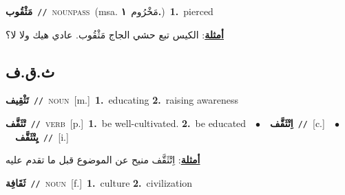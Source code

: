\documentclass[10pt,a4paper,twoside]{article} %
\begin{document}
\begin{multicols}{2}
{\setlength\topsep{0pt}\textbf{\foreignlanguage{arabic}{مَثْقُوب}}\ {\color{gray}\texttt{//}\color{black}}\ \textsc{noun\textunderscore pass}\ \color{gray}(msa. \foreignlanguage{arabic}{مَخْرُوم}~\foreignlanguage{arabic}{\textbf{١.}})\color{black}\ \textbf{1.}~pierced\  \begin{flushright}\color{gray}\foreignlanguage{arabic}{\textbf{\underline{\foreignlanguage{arabic}{أمثلة}}}: الكيس تبع حشي الجاج مَثْقُوب. عادي هيك ولا لا؟}\end{flushright}\color{black}} \vspace{2mm}

\vspace{-3mm}
\subsection*{\color{blue}\foreignlanguage{arabic}{ث.ق.ف}\color{blue}{}} 

{\setlength\topsep{0pt}\textbf{\foreignlanguage{arabic}{تَثْقِيف}}\ {\color{gray}\texttt{//}\color{black}}\ \textsc{noun}\ [m.]\ \textbf{1.}~educating  \textbf{2.}~raising awareness\ } \vspace{2mm}

{\setlength\topsep{0pt}\textbf{\foreignlanguage{arabic}{تْثَقَّف}}\ {\color{gray}\texttt{//}\color{black}}\ \textsc{verb}\ [p.]\ \textbf{1.}~be well-cultivated.  \textbf{2.}~be educated\ \ $\bullet$\ \ \setlength\topsep{0pt}\textbf{\foreignlanguage{arabic}{اِتْثَقَّف}}\ {\color{gray}\texttt{//}\color{black}}\ [c.]\ \ $\bullet$\ \ \setlength\topsep{0pt}\textbf{\foreignlanguage{arabic}{يِتْثَقَّف}}\ {\color{gray}\texttt{//}\color{black}}\ [i.]\  \begin{flushright}\color{gray}\foreignlanguage{arabic}{\textbf{\underline{\foreignlanguage{arabic}{أمثلة}}}: اِتْثَقَّف منيح عن الموضوع قبل ما تقدم عليه}\end{flushright}\color{black}} \vspace{2mm}

{\setlength\topsep{0pt}\textbf{\foreignlanguage{arabic}{ثَقَافِة}}\ {\color{gray}\texttt{//}\color{black}}\ \textsc{noun}\ [f.]\ \textbf{1.}~culture  \textbf{2.}~civilization\ } \vspace{2mm}


\end{multicols}
\end{document}
